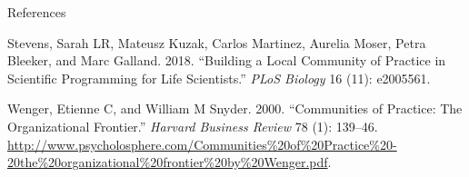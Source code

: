 \documentclass[
  ignorenonframetext,
]{beamer}
\newlength{\cslhangindent}
\newlength{\cslentryspacingunit} %
\newenvironment{CSLReferences}[2] %
 {%
  \setlength{\parindent}{0pt}
  \ifodd #1
  \let\oldpar\par
  \def\par{\hangindent=\cslhangindent\oldpar}
  \fi
  \setlength{\parskip}{#2\cslentryspacingunit}
 }%
 {}
\begin{document}
\begin{frame}{References}
\begin{CSLReferences}{1}{0}
\leavevmode{}%
Stevens, Sarah LR, Mateusz Kuzak, Carlos Martinez, Aurelia Moser, Petra
Bleeker, and Marc Galland. 2018. {``Building a Local Community of
Practice in Scientific Programming for Life Scientists.''} \emph{PLoS
Biology} 16 (11): e2005561.

\leavevmode{}%
Wenger, Etienne C, and William M Snyder. 2000. {``Communities of
Practice: The Organizational Frontier.''} \emph{Harvard Business Review}
78 (1): 139--46.
\url{http://www.psycholosphere.com/Communities\%20of\%20Practice\%20-20the\%20organizational\%20frontier\%20by\%20Wenger.pdf}.

\end{CSLReferences}
\end{frame}
\end{document}
